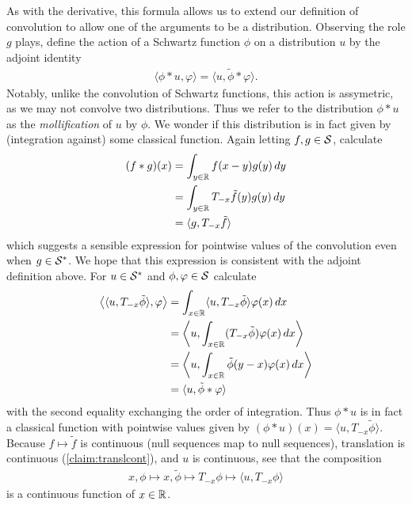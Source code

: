     As with the derivative, this formula allows us to extend our definition of convolution to allow one of the arguments to be a distribution.
    Observing the role $g$ plays, define the action of a Schwartz function $\phi$ on a distribution $u$ by the adjoint identity
    \begin{align*}
      \langle \phi*u, \varphi\rangle
      = \langle u, \tilde\phi*\varphi\rangle \text{.}
    \end{align*}
    Notably, unlike the convolution of Schwartz functions, this action is assymetric, as we may not convolve two distributions.
    Thus we refer to the distribution $\phi*u$ as the \emph{mollification} of $u$ by $\phi$.
    We wonder if this distribution is in fact given by (integration against) some classical function.
    Again letting $f,g\in\S$, calculate
    \begin{align*}
      (f*g)(x)
      &= \int_{y\in\R} f(x-y)g(y)\,dy
      \\&= \int_{y\in\R} T_{-x}\tilde f(y) g(y)\, dy
      \\&= \langle g, T_{-x}\tilde f\rangle
    \end{align*}
    which suggests a sensible expression for pointwise values of the convolution even when $g\in\SS$.
    We hope that this expression is consistent with the adjoint definition above.
    For $u\in\SS$ and $\phi,\varphi\in\S$ calculate
    \begin{align*}
      \left\langle \langle u,T_{-x}\tilde\phi\rangle, \varphi \right\rangle
      &= \int_{x\in\R} \langle u,T_{-x}\tilde\phi\rangle\varphi(x)\,dx
      \\&= \left\langle u, \int_{x\in\R} (T_{-x}\tilde\phi)\varphi(x)\,dx \right\rangle
      \\&= \left\langle u, \int_{x\in\R} \tilde\phi(y-x)\varphi(x)\,dx \right\rangle
      \\&= \langle u, \tilde\phi*\varphi\rangle
    \end{align*}
    with the second equality exchanging the order of integration.
    Thus $\phi*u$ is in fact a classical function with pointwise values given by $(\phi*u)(x)=\langle u, T_{-x}\tilde\phi\rangle$.
    Because $f\mapsto\tilde f$ is continuous (null sequences map to null sequences), translation is continuous (\cref{claim:translcont}), and $u$ is continuous, see that the composition
    \begin{align*}
      x, \phi \mapsto x, \tilde\phi \mapsto T_{-x}\phi \mapsto \langle u, T_{-x}\phi \rangle
    \end{align*}
    is a continuous function of $x\in\R$.
    
